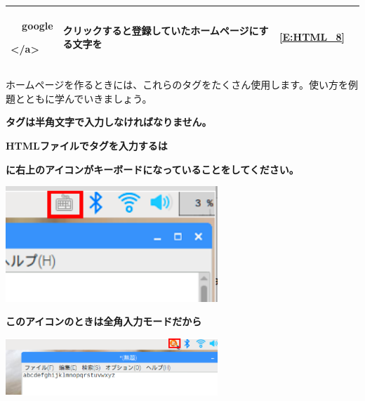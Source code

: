 \documentclass[a4paper,12pt]{jarticle}
\begin{document}
{\begin{center}
\begin{supertabular}{|m{1.6cm}|m{5.1060004cm}|m{7.8930006cm}|m{2.037cm}|}
      \ \ google

        {\textless}/a{\textgreater} &
      クリックすると登録していたホームページにする文字を
      &
      \ref*{E:HTML_8}\\\hline
    \end{supertabular}
  \end{center}
}

\bigskip
ホームページを作るときには、これらのタグをたくさん使用します。使い方を例題とともに学んでいきましょう。


\clearpage


{\centering\bfseries
  タグは半角文字で入力しなければなりません。
  \par}

{\centering\bfseries
  HTMLファイルでタグを入力するは
  \par}

{\centering\bfseries
  に右上のアイコンがキーボードになっていることをしてください。
  \par}

\centering
\includegraphics[width=0.6\textwidth]{textbook-img159.png}





\bigskip

\bigskip

\bigskip

\bigskip


{\centering\bfseries
  このアイコンのときは全角入力モードだから
  \par}

\centering
\includegraphics[width=0.6\textwidth]{textbook-img160.png}


\bigskip


\bigskip
\end{document}
